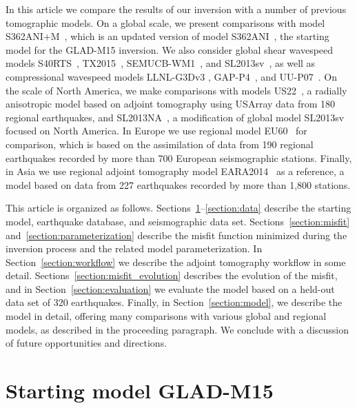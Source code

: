 \documentclass[extra,mreferee]{gji}
\begin{document}
In this article we compare the results of our inversion with a number of previous tomographic models.
On a global scale, we present comparisons with model S362ANI$+$M~\citep{moulik2014anisotropic},
which is an updated version of model S362ANI~\citep{s362ani},
the starting model for the GLAD-M15 inversion.
We also consider global shear wavespeed models S40RTS~\citep{ritsema2011s40rts},
TX2015~\citep{TX2015}, SEMUCB-WM1~\citep{french2015broad},
and SL2013sv~\citep{SchaefferLebedev13},
as well as compressional wavespeed models LLNL-G3Dv3 \citep{simmons2012llnl}, GAP-P4~\citep{fukao2013subducted}, and UU-P07~\citep{van2018atlas}.
On the scale of North America,
we make comparisons with models US22~\citep{zhu2017radial},
a radially anisotropic model based on adjoint tomography using USArray data from 180 regional earthquakes,
and SL2013NA~\citep{schaeffer2014imaging},
a modification of global model SL2013sv focused on North America.
In Europe we use regional model EU60~\citep{zhu2015seismic} for comparison,
which is based on the assimilation of data from 190 regional earthquakes recorded by more than 700 European seismographic stations.
Finally, in Asia we use regional adjoint tomography model EARA2014~\citep{chen2015multiparameter} as a reference, a model based on data from 227 earthquakes recorded by more than 1,800 stations.

This article is organized as follows.
Sections~\ref{section:start}--\ref{section:data} describe the starting model,
earthquake database, and seismographic data set. 
Sections~\ref{section:misfit} and~\ref{section:parameterization} describe the misfit function minimized during the inversion process
and the related model parameterization.
In Section~\ref{section:workflow} we describe the adjoint tomography workflow in some detail.
Sections~\ref{section:misfit_evolution} describes the evolution of the misfit, and in Section~\ref{section:evaluation} we evaluate the model based on a held-out data set of 320 earthquakes.
Finally, in Section~\ref{section:model}, we describe the model in detail,
offering many comparisons with various global and regional models, as described in the proceeding paragraph.
We conclude with a discussion of future opportunities and directions.

\section{Starting model GLAD-M15}
\label{section:start}
\end{document}
